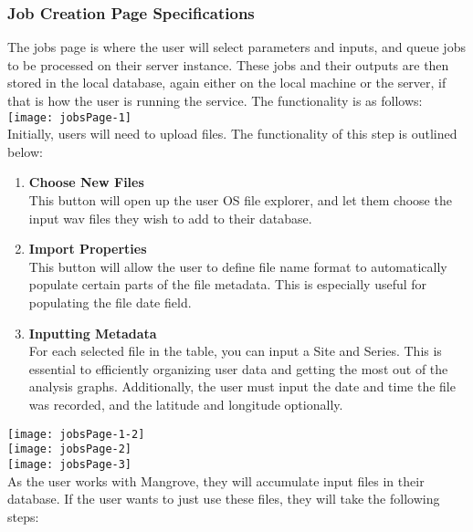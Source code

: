 \subsubsection{Job Creation Page Specifications}
The jobs page is where the user will select parameters and inputs, and queue jobs to be processed on their server instance. These jobs and their outputs are then stored in the local database, again either on the local machine or the server, if that is how the user is running the service. The functionality is as follows:\\
\texttt{[image: jobsPage-1]}\\
Initially, users will need to upload files. The functionality of this step is outlined below:\\
\begin{enumerate}
  \item \textbf{Choose New Files}\\ This button will open up the user OS file explorer, and let them choose the input wav files they wish to add to their database.
  \item \textbf{Import Properties}\\ This button will allow the user to define file name format to automatically populate certain parts of the file metadata. This is especially useful for populating the file date field.
  \item \textbf{Inputting Metadata}\\ For each selected file in the table, you can input a Site and Series. This is essential to efficiently organizing user data and getting the most out of the analysis graphs. Additionally, the user must input the date and time the file was recorded, and the latitude and longitude optionally.
\end{enumerate}
\texttt{[image: jobsPage-1-2]}\\
\texttt{[image: jobsPage-2]}\\
\texttt{[image: jobsPage-3]}\\
As the user works with Mangrove, they will accumulate input files in their database. If the user wants to just use these files, they will take the following steps:\\
